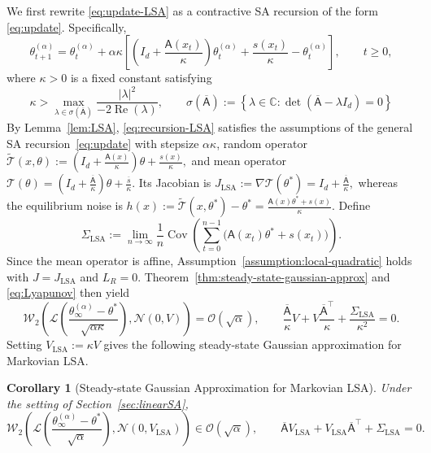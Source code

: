 \documentclass[11pt,letterpaper]{article}
\theoremstyle{plain}
\newtheorem{corollary}{Corollary}
\theoremstyle{definition}
\theoremstyle{remark}
\newcommand{\mT}{\mathcal{T}}
\newcommand{\W}{\mathcal{W}}
\newcommand{\tmT}{\widetilde{\mT}}
\newcommand{\law}{\mathcal{L}}
\begin{document}
We first rewrite \eqref{eq:update-LSA} as a contractive SA recursion of the
form \eqref{eq:update}. Specifically,
\begin{equation}
\label{eq:recursion-LSA}
    \theta_{t+1}^{(\alpha)}
    =
    \theta_t^{(\alpha)}
    +
    \alpha\kappa
    \left[
        \left(I_d+\frac{\mathsf A(x_t)}{\kappa}\right)
        \theta_t^{(\alpha)}
        +
        \frac{s(x_t)}{\kappa}
        -
        \theta_t^{(\alpha)}
    \right],
    \qquad t\geq0,
\end{equation}
where \(\kappa>0\) is a fixed constant satisfying
\[
    \kappa
    >
    \max_{\lambda\in\sigma(\overline{\mathsf A})}
    \frac{|\lambda|^2}{-2\operatorname{Re}(\lambda)},\qquad\sigma(\overline{\mathsf A})
    :=
    \left\{
        \lambda\in\mathbb C:
        \det(\overline{\mathsf A}-\lambda I_d)=0
    \right\}
\]
By Lemma~\ref{lem:LSA}, \eqref{eq:recursion-LSA} satisfies the assumptions of
the general SA recursion~\eqref{eq:update} with stepsize \(\alpha\kappa\),
random operator $\tmT(x,\theta)
    :=
    \left(I_d+\frac{\mathsf A(x)}{\kappa}\right)\theta
    +\frac{s(x)}{\kappa},$ and mean operator $\mT(\theta)
    =
    \left(I_d+\frac{\overline{\mathsf A}}{\kappa}\right)\theta
    +\frac{\overline s}{\kappa}.$ Its Jacobian is $ J_{\mathrm{LSA}}
    :=\nabla\mT(\theta^*)
    =I_d+\frac{\overline{\mathsf A}}{\kappa},$ whereas the equilibrium noise is $ h(x)
    :=\tmT(x,\theta^*)-\theta^*
    =\frac{\mathsf A(x)\theta^*+s(x)}{\kappa}.$ Define
\[
    \Sigma_{\mathrm{LSA}}
    :=
    \lim_{n\to\infty}
    \frac{1}{n}
    \operatorname{Cov}\left(
        \sum_{t=0}^{n-1}
        \bigl(\mathsf A(x_t)\theta^*+s(x_t)\bigr)
    \right).
\]
Since the mean operator is affine, Assumption~\ref{assumption:local-quadratic}
holds with \(J=J_{\mathrm{LSA}}\) and \(L_R=0\).
Theorem~\ref{thm:steady-state-gaussian-approx} and
\eqref{eq:Lyapunov} then yield
\[
    \W_2\left(
        \law\left(
            \frac{\theta_\infty^{(\alpha)}-\theta^*}
                 {\sqrt{\alpha\kappa}}
        \right),
        \mathcal N(0,V)
    \right)
    =
    \mathcal O(\sqrt{\alpha}),\qquad\frac{\overline{\mathsf A}}{\kappa}V
    +
    V\frac{\overline{\mathsf A}^\top}{\kappa}
    +
    \frac{\Sigma_{\mathrm{LSA}}}{\kappa^2}
    =
    0.
\]
Setting \(V_{\mathrm{LSA}}:=\kappa V\) gives the following steady-state Gaussian approximation for
Markovian LSA.
\begin{corollary}[Steady-state Gaussian Approximation for Markovian LSA]
\label{cor:lsa-steady-state-gaussian}
Under the setting of Section~\ref{sec:linearSA}, 
\begin{equation}
\label{eq:lsa-scaled-gaussian-bound}
    \W_2\left(
        \law\left(
            \frac{
                \theta_\infty^{(\alpha)}-\theta^*
            }{
                \sqrt{\alpha}
            }
        \right),
        \mathcal N(0,V_{\mathrm{LSA}})
    \right)
    \in \mathcal O(\sqrt{\alpha}), \qquad \overline{\mathsf A} V_{\mathrm{LSA}} + V_{\mathrm{LSA}}\overline{\mathsf A}^\top   + \Sigma_{\operatorname{LSA}} = 0.
\end{equation}
\end{corollary}
\end{document}
